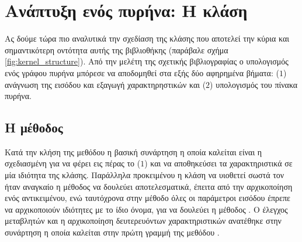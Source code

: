 \section{Ανάπτυξη ενός πυρήνα: Η κλάση }
Ας δούμε τώρα πιο αναλυτικά την σχεδίαση της κλάσης  που αποτελεί την κύρια και σημαντικότερη οντότητα αυτής της βιβλιοθήκης (παράβαλε σχήμα \ref{fig:kernel_structure}).
Από την μελέτη της σχετικής βιβλιογραφίας ο υπολογισμός ενός γράφου πυρήνα μπόρεσε να αποδομηθεί στα εξής δύο αφηρημένα βήματα:  ($1$) ανάγνωση της εισόδου και εξαγωγή χαρακτηρηστικών και ($2$) υπολογισμός του πίνακα πυρήνα.
\subsection{Η μέθοδος \texttt{}}
Κατά την κλήση της μεθόδου \texttt{} η βασική συνάρτηση η οποία καλείται είναι η \texttt{} σχεδιασμένη για να φέρει εις πέρας το ($1$) και να αποθηκεύσει τα χαρακτηριστικά σε μία ιδιότητα της κλάσης.
Παράλληλα προκειμένου η κλάση  να υιοθετεί σωστά τον  ήταν αναγκαίο η μέθοδος  να δουλεύει αποτελεσματικά, έπειτα από την αρχικοποίηση ενός αντικειμένου, ενώ ταυτόχρονα στην μέθοδο   όλες οι παράμετροι εισόδου έπρεπε να αρχικοποιούν ιδιότητες με το ίδιο όνομα, για να δουλεύει η μέθοδος .
Ο έλεγχος μεταβλητών και η αρχικοποίηση δευτερευόντων χαρακτηριστικών ανατέθηκε στην συνάρτηση \texttt{} η οποία καλείται στην πρώτη γραμμή της μεθόδου \texttt{}.

